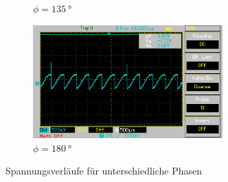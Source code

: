 \begin{figure}
\begin{subfigure}{0.5\textwidth}
    \caption{$\phi = \qty[]{135}{\degree}$}%
    \label{fig:phase4}%
    \end{subfigure}%
    \hfill
    \begin{subfigure}{0.5\textwidth}%
    \centering%
    \includegraphics[width = 7.3cm]{./Oszilloskop Bilder/png/5.2/5 MAP006.png}%
    \caption{$\phi = \qty[]{180}{\degree}$}%
    \label{fig:phase5}%
    \end{subfigure}%
    \caption{Spannungsverläufe für unterschiedliche Phasen}%
    \label{fig:phasenunterschiede}%
\end{figure}%
%  
%

